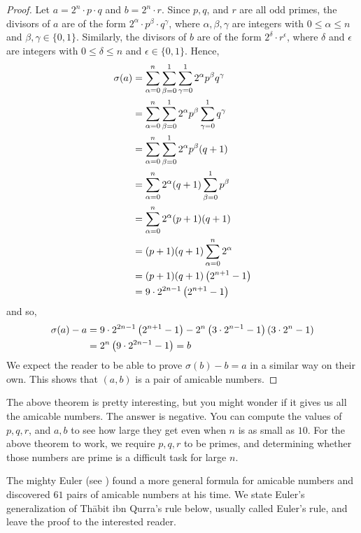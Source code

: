 \begin{proof}
	Let $a=2^n\cdot p \cdot q$ and  $b=2^n\cdot r$. Since $p, q$, and $r$ are all odd primes, the divisors of $a$ are of the form $2^{\alpha}\cdot p^{\beta} \cdot q^{\gamma}$, where $\alpha, \beta, \gamma $ are integers with $0\leq \alpha \leq n$ and $\beta, \gamma \in \{0, 1\}$. Similarly, the divisors of $b$ are of the form $2^{\delta} \cdot r^{\epsilon}$, where $\delta$ and $\epsilon$ are integers with $0 \leq \delta \leq n$ and $\epsilon \in \{0,1\}$. Hence,
	\begin{align*}
		\sigma(a)
			&= \sum_{\alpha=0}^{n} \sum_{\beta=0}^{1} \sum_{\gamma=0}^1 2^{\alpha} p^{\beta}  q^{\gamma}\\
			& = \sum_{\alpha=0}^{n} \sum_{\beta=0}^{1} 2^{\alpha} p^{\beta}\sum_{\gamma=0}^1 q^{\gamma}\\
			& = \sum_{\alpha=0}^{n} \sum_{\beta=0}^{1} 2^{\alpha} p^{\beta}   (q+1)\\
			& = \sum_{\alpha=0}^{n} 2^{\alpha} (q+1) \sum_{\beta=0}^{1} p^{\beta}\\
			& = \sum_{\alpha=0}^{n} 2^{\alpha} (p+1)(q+1)\\
			& = (p+1)(q+1)  \sum_{\alpha=0}^{n} 2^{\alpha}\\
			& =  (p+1)(q+1) \left(2^{n+1} - 1\right)\\
			& = 9 \cdot 2^{2n-1}\left(2^{n+1} - 1\right)
	\end{align*}
	and so,
	\begin{align*}
		\sigma(a)-a
			& =  9 \cdot 2^{2n-1}\left(2^{n+1} - 1\right)- 2^n\left(3 \cdot 2^{n-1} - 1\right)\left(3 \cdot 2^{n} - 1\right)\\
			& = 2^n \left(9 \cdot 2^{2n-1}-1\right)= b
	\end{align*}
	We expect the reader to be able to prove $\sigma(b)-b=a$ in a similar way on their own. This shows that $(a,b)$ is a pair of amicable numbers.
\end{proof}

The above theorem is pretty interesting, but you might wonder if it gives us all the amicable numbers. The answer is negative. You can compute the values of $p, q, r$, and $a,b$ to see how large they get even when $n$ is as small as $10$. For the above theorem to work, we require $p,q,r$ to be primes, and determining whether those numbers are prime is a difficult task for large $n$.

The mighty Euler (see \textcite[Chapter I, Page $42$]{dickson_1952}) found a more general formula for amicable numbers and discovered $61$ pairs of amicable numbers at his time. We state Euler's generalization of Th\={a}bit ibn Qurra's rule below, usually called Euler's rule, and leave the proof to the interested reader.

